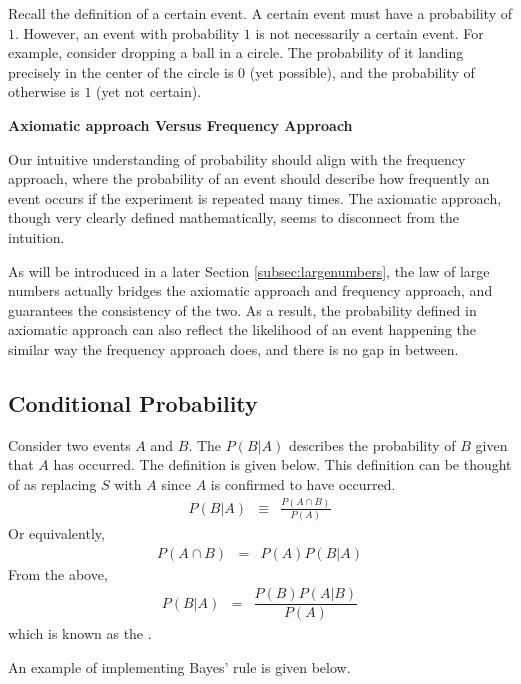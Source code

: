 Recall the definition of a certain event. A certain event must have a probability of $1$. However, an event with probability $1$ is not necessarily a certain event. For example, consider dropping a ball in a circle. The probability of it landing precisely in the center of the circle is $0$ (yet possible), and the probability of otherwise is $1$ (yet not certain).

\begin{mdframed}
\noindent \textbf{Axiomatic approach Versus Frequency Approach}

Our intuitive understanding of probability should align with the frequency approach, where the probability of an event should describe how frequently an event occurs if the experiment is repeated many times. The axiomatic approach, though very clearly defined mathematically, seems to disconnect from the intuition.

As will be introduced in a later Section \ref{subsec:largenumbers}, the law of large numbers actually bridges the axiomatic approach and frequency approach, and guarantees the consistency of the two. As a result, the probability defined in axiomatic approach can also reflect the likelihood of an event happening the similar way the frequency approach does, and there is no gap in between.

\end{mdframed}

\subsection{Conditional Probability}

Consider two events $A$ and $B$. The  $P(B|A)$ describes the probability of $B$ given that $A$ has occurred. The definition is given below. This definition can be thought of as replacing $S$ with $A$ since $A$ is confirmed to have occurred.
\begin{eqnarray}
  P(B|A) &\equiv& \frac{P(A\cap B)}{P(A)} \nonumber
\end{eqnarray}
Or equivalently,
\begin{eqnarray}
  P(A\cap B) &=& P(A)P(B|A) \nonumber
\end{eqnarray}
From the above,
\begin{eqnarray}
  P(B|A) &=& \dfrac{P(B)P(A|B)}{P(A)} \nonumber
\end{eqnarray}
which is known as the .

An example of implementing Bayes' rule is given below.

